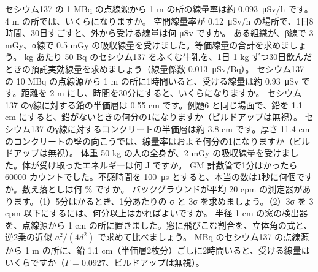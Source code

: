\bkendproblems
{}
\bkproblem セシウム137 の 1 MBq の点線源から 1 m の所の線量率は約 \qty{0.093}{\micro Sv/h} です。4 m の所では、いくらになりますか。
\bkproblem 空間線量率が \qty{0.12}{\micro Sv/h} の場所で、1日8時間、30日すごすと、外から受ける線量は何 \si{\micro Sv} ですか。
\bkproblem ある組織が、β線で 3 mGy、α線で 0.5 mGy の吸収線量を受けました。等価線量の合計を求めましょう。
 kg あたり 50 Bq のセシウム137 をふくむ牛乳を、1日 1 kg ずつ30日飲んだときの預託実効線量を求めましょう（線量係数 \qty{0.013}{\micro Sv}/Bq）。
\bkproblem セシウム137 の 10 MBq の点線源から 1 m の所に1時間いると、受ける線量は約 \qty{0.93}{\micro Sv} です。距離を 2 m にし、時間を30分にすると、いくらになりますか。
\bkproblem セシウム137 のγ線に対する鉛の半価層は 0.55 cm です。例題6 と同じ場面で、鉛を 1.1 cm にすると、鉛がないときの何分の1になりますか（ビルドアップは無視）。
\bkproblem セシウム137 のγ線に対するコンクリートの半価層は約 3.8 cm です。厚さ 11.4 cm のコンクリートの壁の向こうでは、線量率はおよそ何分の1になりますか（ビルドアップは無視）。
\bkproblem 体重 50 kg の人の全身が、2 mGy の吸収線量を受けました。体が受け取ったエネルギーは何 J ですか。
\bkproblem GM 計数管で1分はかったら \num{60000} カウントでした。不感時間を \qty{100}{\micro s} とすると、本当の数は1秒に何個ですか。数え落としは何 \% ですか。
\bkproblem バックグラウンドが平均 20 cpm の測定器があります。（1）5分はかるとき、1分あたりの σ と 3σ を求めましょう。（2）3σ を 3 cpm 以下にするには、何分以上はかればよいですか。
\bkproblem 半径 1 cm の窓の検出器を、点線源から 1 cm の所に置きました。窓に飛びこむ割合を、立体角の式と、逆2乗の近似 $a^2/(4d^2)$ で求めて比べましょう。
 MBq のセシウム137 の点線源から 1 m の所に、鉛 1.1 cm（半価層2枚分）ごしに2時間いると、受ける線量はいくらですか（$\Gamma=0.0927$、ビルドアップは無視）。

